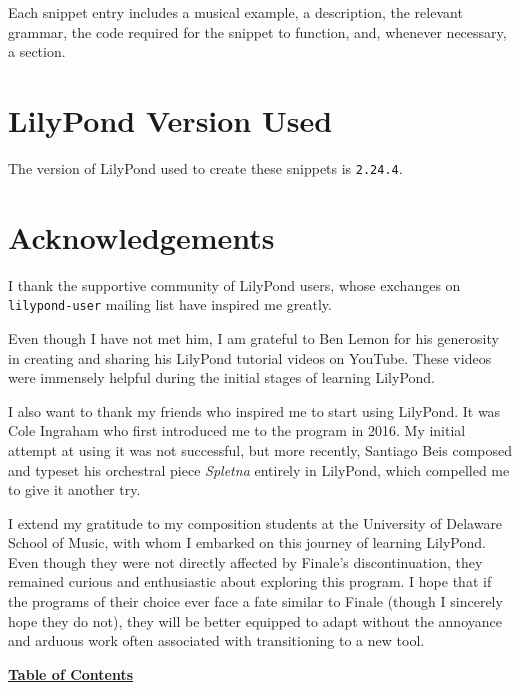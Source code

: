 Each snippet entry includes a musical example, a description, the relevant grammar, the code required for the snippet to function, and, whenever necessary, a  section.

\section{LilyPond Version Used}
The version of LilyPond used to create these snippets is \verb|2.24.4|.

\section{Acknowledgements}
I thank the supportive community of LilyPond users, whose exchanges on \Verb|lilypond-user| mailing list have inspired me greatly.

Even though I have not met him, I am grateful to Ben Lemon for his generosity in creating and sharing his LilyPond tutorial videos on YouTube. These videos were immensely helpful during the initial stages of learning LilyPond.

I also want to thank my friends who inspired me to start using LilyPond. It was Cole Ingraham who first introduced me to the program in 2016. My initial attempt at using it was not successful, but more recently, Santiago Beis composed and typeset his orchestral piece \textit{Spletna} entirely in LilyPond, which compelled me to give it another try.

I extend my gratitude to my composition students at the University of Delaware School of Music, with whom I embarked on this journey of learning LilyPond. Even though they were not directly affected by Finale's discontinuation, they remained curious and enthusiastic about exploring this program. I hope that if the programs of their choice ever face a fate similar to Finale (though I sincerely hope they do not), they will be better equipped to adapt without the annoyance and arduous work often associated with transitioning to a new tool. \par

\hyperref[sec:toc]{\textbf{Table of Contents}}


\clearpage
\vfill \break
